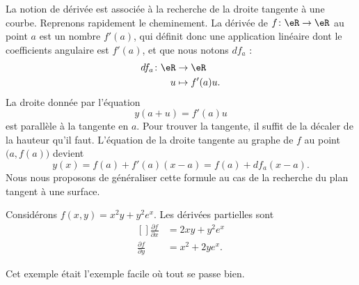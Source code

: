 La notion de dérivée est associée à la recherche de la droite tangente à une courbe. Reprenons rapidement le cheminement. La dérivée de $f\colon \eR\to \eR$ au point $a$ est un nombre $f'(a)$, qui définit donc une application linéaire dont le coefficients angulaire est $f'(a)$, et que nous notons $df_a$ :
\begin{equation}
    \begin{aligned}
        df_a\colon \eR&\to \eR \\
        u&\mapsto f'(a)u. 
    \end{aligned}
\end{equation}
La droite donnée par l'équation
\begin{equation}
    y(a+u)=f'(a)u
\end{equation}
est parallèle à la tangente en $a$. Pour trouver la tangente, il suffit de la décaler de la hauteur qu'il faut. L'équation de la droite tangente au graphe de $f$ au point $\big( a,f(a) \big)$ devient
\begin{equation}        \label{EqDiffRapTgDer}
    y(x)=f(a)+f'(a)(x-a)=f(a)+df_a(x-a).
\end{equation}
Nous nous proposons de généraliser cette formule au cas de la recherche du plan tangent à une surface.

\begin{example}
    Considérons $f(x,y)=x^2y+y^2 e^{x}$. Les dérivées partielles sont
    \begin{equation}
        \begin{aligned}[]
            \frac{ \partial f }{ \partial x }&=2xy+y^2e^x\\
            \frac{ \partial f }{ \partial y }&=x^2+2ye^x.
        \end{aligned}
    \end{equation}
\end{example}

Cet exemple était l'exemple facile où tout se passe bien.


